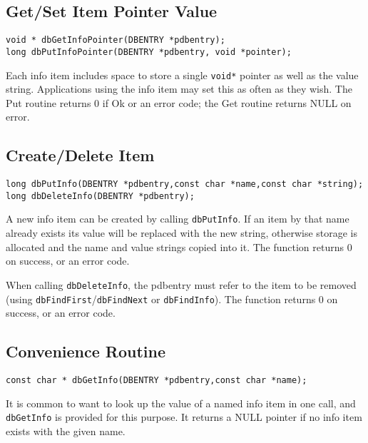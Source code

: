 \subsection{Get/Set Item Pointer Value}

\begin{verbatim}
void * dbGetInfoPointer(DBENTRY *pdbentry);
long dbPutInfoPointer(DBENTRY *pdbentry, void *pointer);
\end{verbatim}

Each info item includes space to store a single \verb|void*| pointer as well as the value string. Applications using the info item 
may set this as often as they wish. The Put routine returns 0 if Ok or an error code; the Get routine returns NULL on error.

\subsection{Create/Delete Item}

\begin{verbatim}
long dbPutInfo(DBENTRY *pdbentry,const char *name,const char *string);
long dbDeleteInfo(DBENTRY *pdbentry);
\end{verbatim}

A new info item can be created by calling \verb|dbPutInfo|. If an item by that name already exists its value will be replaced 
with the new string, otherwise storage is allocated and the name and value strings copied into it. The function returns 0 on 
success, or an error code.

When calling \verb|dbDeleteInfo|, the pdbentry must refer to the item to be removed (using \verb|dbFindFirst|/\verb|dbFindNext| 
or \verb|dbFindInfo|). The function returns 0 on success, or an error code.

\subsection{Convenience Routine}

\begin{verbatim}
const char * dbGetInfo(DBENTRY *pdbentry,const char *name);
\end{verbatim}

It is common to want to look up the value of a named info item in one call, and \verb|dbGetInfo| is provided for this purpose. 
It returns a NULL pointer if no info item exists with the given name.

